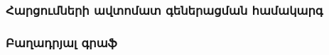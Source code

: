 {
	\subsubsection{Հարցումների ավտոմատ գեներացման համակարգ}\label{subsubsec:queryAggregation}
	

	\subsubsection{Բաղադրյալ գրաֆ}\label{subsubsec:proceduregraph}
	
}
